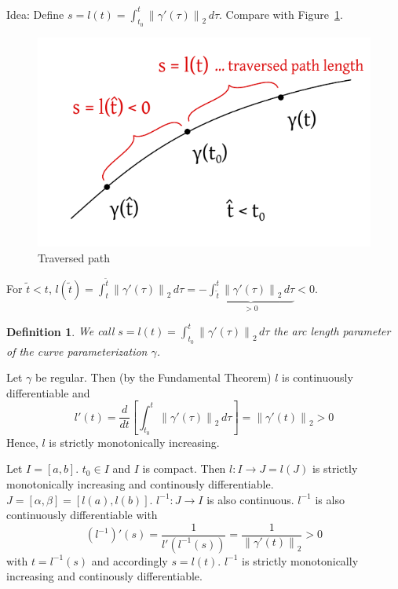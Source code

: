 \documentclass{article}
\newtheorem{definition}{Definition}  \numberwithin{definition}{section}
\newcommand{\norm}[1]{\left\|#1\right\|}
\begin{document}
Idea: Define $s = l(t) = \int_{t_0}^t \norm{\gamma'(\tau)}_2 \, d\tau$. Compare with Figure~\ref{img:traversedpath}.

\begin{figure}[t]
  \begin{center}
    \includegraphics{img/47_traversed_path.pdf}
    \caption{Traversed path}
    \label{img:traversedpath}
  \end{center}
\end{figure}

For $\tilde t < t$, $l(\tilde t) = \int_{t}^{\tilde t} \norm{\gamma'(\tau)}_2 \, d\tau = -\underbrace{\int_{\tilde t}^{t} \norm{\gamma'(\tau)}_2 \, d\tau}_{> 0} < 0$.

\begin{definition}
  We call $s = l(t) = \int_{t_0}^t \norm{\gamma'(\tau)}_2 \, d\tau$ the arc length parameter of the curve parameterization $\gamma$.
\end{definition}

Let $\gamma$ be regular. Then (by the Fundamental Theorem) $l$ is continuously differentiable and
\[ l'(t) = \frac{d}{dt} \left[\int_{t_0}^t \norm{\gamma'(\tau)}_2 \, d\tau\right] = \norm{\gamma'(t)}_2 > 0 \]
Hence, $l$ is strictly monotonically increasing.

Let $I = [a,b]$. $t_0 \in I$ and $I$ is compact. Then $l: I \to J = l(J)$ is strictly monotonically increasing and continously differentiable. $J = [\alpha, \beta] = [l(a), l(b)]$. $l^{-1}: J \to I$ is also continuous. $l^{-1}$ is also continuously differentiable with
\[ (l^{-1})'(s) = \frac{1}{l'(l^{-1}(s))} = \frac{1}{\norm{\gamma'(t)}_2} > 0 \]
with $t = l^{-1}(s)$ and accordingly $s = l(t)$. $l^{-1}$ is strictly monotonically increasing and continously differentiable.
\end{document}

